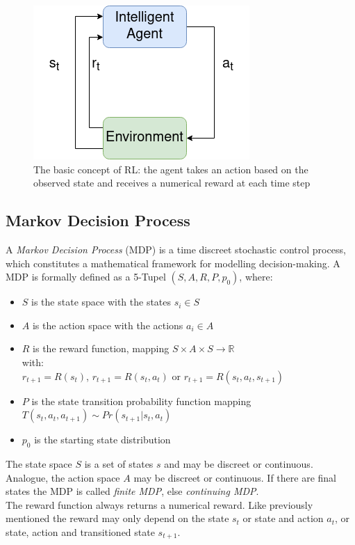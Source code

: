 \begin{figure}
	\centering
	\includegraphics[width=0.4\linewidth]{figures/rl.png}
	\caption{The basic concept of RL: the agent takes an action based on the observed state and receives a numerical reward at each time step}
	\label{fig:rl}
\end{figure}

\newpage

\subsection{Markov Decision Process} \label{sec:MDP}
A \emph{Markov Decision Process} (MDP) is a time discreet stochastic control process, which constitutes a mathematical framework for modelling decision-making. 
A MDP is formally defined as a 5-Tupel $(S,A,R,P,p_0)$, where:
\begin{itemize}
	\item $S$ is the state space with the states $s_i \in S$ 
	\item $A$ is the action space with the actions $a_i \in A$
	\item $R$ is the reward function, mapping $S \times A \times S \to \mathbb{R}$\\
				with:\\
				$r_{t+1} = R(s_t)$, $r_{t+1} = R(s_t, a_t)$ or $r_{t+1} = R(s_t, a_t, s_{t+1})$
	\item $P$ is the state transition probability function mapping $T(s_t,a_t,a_{t+1}) \sim Pr(s_{t+1}|s_t,a_t)$
	\item $p_0$ is the starting state distribution 
\end{itemize}
The state space $S$ is a set of states $s$ and may be discreet or continuous. 
Analogue, the action space $A$ may be discreet or continuous. 
If there are final states the MDP is called \emph{finite MDP}, else \emph{continuing MDP}. \\
The reward function always returns a numerical reward. 
Like previously mentioned the reward may only depend on the state $s_t$ or state and action $a_t$, or state, action and transitioned state $s_{t+1}$. \\
